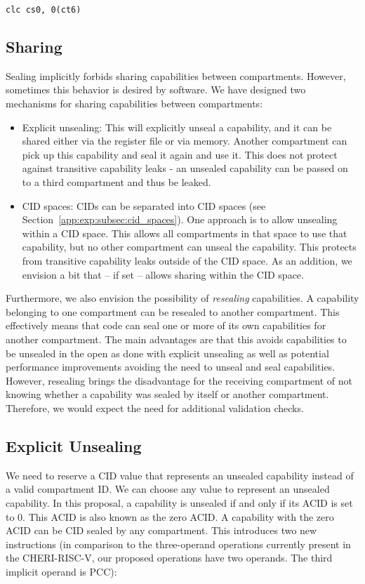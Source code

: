 \texttt{clc cs0, 0(ct6)}

\subsection{Sharing}

Sealing implicitly forbids sharing capabilities between compartments.
However, sometimes this behavior is desired by software. We have designed two mechanisms for sharing capabilities between compartments:

\begin{itemize}
\item Explicit unsealing: This will explicitly unseal a capability, and it can be shared either via the register file or via memory.
Another compartment can pick up this capability and seal it again and use it.
This does not protect against transitive capability leaks - an unsealed capability can be passed on to a third compartment and thus be leaked.
\item CID spaces: CIDs can be separated into CID spaces (see Section~\ref{app:exp:subsec:cid_spaces}).
One approach is to allow unsealing within a CID space.
This allows all compartments in that space to use that capability, but no other compartment can unseal the capability.
This protects from transitive capability leaks outside of the CID space.
As an addition, we envision a bit that -- if set -- allows sharing within the CID space.
\end{itemize}

Furthermore, we also envision the possibility of \textit{resealing} capabilities.
A capability belonging to one compartment can be resealed to another compartment.
This effectively means that code can seal one or more of its own capabilities for another compartment.
The main advantages are that this avoids capabilities to be unsealed in the open as done with explicit unsealing as well as potential performance improvements avoiding the need to unseal and seal capabilities.
However, resealing brings the disadvantage for the receiving compartment of not knowing whether a capability was sealed by itself or another compartment.
Therefore, we would expect the need for additional validation checks.

\subsection{Explicit Unsealing}

We need to reserve a CID value that represents an unsealed capability instead of a valid compartment ID.
We can choose any value to represent an unsealed capability.
In this proposal, a capability is unsealed if and only if  its ACID is set to 0.
This ACID is also known as the zero ACID. A capability with the zero ACID can be CID sealed by any compartment.
This introduces two new instructions (in comparison to the three-operand operations currently present in the CHERI-RISC-V, our proposed operations have two operands. The third implicit operand is PCC):

